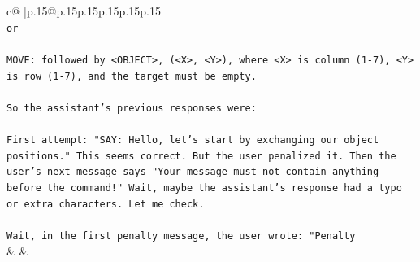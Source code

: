 \documentclass{article}
\begin{document}
{\begin{supertabular}{c@{$\;$}|p{.15\linewidth}@{}p{.15\linewidth}p{.15\linewidth}p{.15\linewidth}p{.15\linewidth}p{.15\linewidth}}
{{{\\ 
\texttt{or} \\
\\ 
\texttt{MOVE: followed by <OBJECT>, (<X>, <Y>), where <X> is column (1{-}7), <Y> is row (1{-}7), and the target must be empty.} \\
\\ 
\texttt{So the assistant's previous responses were:} \\
\\ 
\texttt{First attempt: "SAY: Hello, let's start by exchanging our object positions." This seems correct. But the user penalized it. Then the user's next message says "Your message must not contain anything before the command!" Wait, maybe the assistant's response had a typo or extra characters. Let me check.} \\
\\ 
\texttt{Wait, in the first penalty message, the user wrote: "Penalty} \\
            }
        }
    }
    & & \\ \\


\end{supertabular}}
\end{document}

